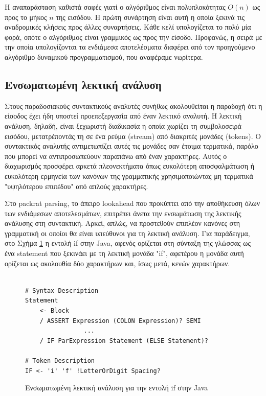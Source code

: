 Η αναπαράσταση καθιστά σαφές γιατί ο αλγόριθμος είναι πολυπλοκότητας $O(n)$ ως προς το μήκος $n$ της εισόδου.
Η πρώτη συνάρτηση είναι αυτή η οποία ξεκινά τις αναδρομικές κλήσεις προς άλλες συναρτήσεις.
Κάθε κελί υπολογίζεται το πολύ μία φορά, οπότε ο αλγόριθμος είναι γραμμικός ως προς την είσοδο. 
Προφανώς, η σειρά με την οποία υπολογίζονται τα ενδιάμεσα αποτελέσματα διαφέρει από τον προηγούμενο αλγόριθμο δυναμικού προγραμματισμού, που αναφέραμε νωρίτερα.

\subsection{Ενσωματωμένη λεκτική ανάλυση}

Στους παραδοσιακούς συντακτικούς αναλυτές συνήθως ακολουθείται η παραδοχή ότι η είσοδος έχει ήδη υποστεί προεπεξεργασία από έναν λεκτικό αναλυτή.
Η λεκτική ανάλυση, δηλαδή, είναι ξεχωριστή διαδικασία η οποία χωρίζει τη συμβολοσειρά εισόδου, μετατρέποντάς τη σε ένα ρεύμα (stream) από διακριτές μονάδες (tokens).
O συντακτικός αναλυτής αντιμετωπίζει αυτές τις μονάδες σαν έτοιμα τερματικά, παρόλο που μπορεί να αντιπροσωπεύουν παραπάνω από έναν χαρακτήρες.
Αυτός ο διαχωρισμός προσφέρει αρκετά πλεονεκτήματα όπως ευκολότερη αποσφαλμάτωση ή ευκολότερη ερμηνεία των κανόνων της γραμματικής χρησιμοποιώντας μη τερματικά "υψηλότερου επιπέδου" από απλούς χαρακτήρες.

Στο packrat parsing, το άπειρο lookahead που προκύπτει από την αποθήκευση όλων των ενδιάμεσων αποτελεσμάτων, επιτρέπει άνετα την ενσωμάτωση της λεκτικής ανάλυσης στη συντακτική.
Αρκεί, απλώς, να προστεθούν επιπλέον κανόνες στη γραμματική οι οποίοι θα είναι υπεύθυνοι για τη λεκτική ανάλυση.
Για παράδειγμα, στο Σχήμα \ref{fig:integrated_lex} η εντολή if στην Java, αφενός ορίζεται στη σύνταξη της γλώσσας ως ένα statement που ξεκινάει με τη λεκτική μονάδα "if", αφετέρου η μονάδα αυτή ορίζεται ως ακολουθία δύο χαρακτήρων και, ίσως μετά, κενών χαρακτήρων.

\begin{figure}[h]
\begin{Verbatim}

# Syntax Description
Statement
    <- Block
    / ASSERT Expression (COLON Expression)? SEMI
				...
    / IF ParExpression Statement (ELSE Statement)?

# Token Description
IF <- 'i' 'f' !LetterOrDigit Spacing? 
\end{Verbatim}
\caption{Ενσωματωμένη λεκτική ανάλυση για την εντολή if στην Java}
\label{fig:integrated_lex}
\end{figure}

